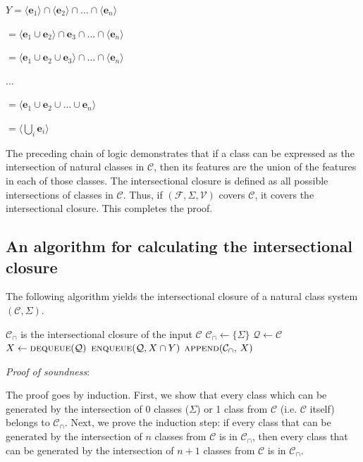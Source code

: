 \documentclass[11pt, oneside]{article}   	%
\begin{document}
$Y = \langle \mathbf{e}_1 \rangle \cap  \langle \mathbf{e}_2 \rangle \cap \ldots \cap  \langle \mathbf{e}_n \rangle$

\quad $ = \langle \mathbf{e}_1 \cup \mathbf{e}_2 \rangle \cap \mathbf{e}_3 \cap \ldots \cap \langle \mathbf{e}_n \rangle$

\quad $ = \langle \mathbf{e}_1 \cup \mathbf{e}_2 \cup \mathbf{e}_3 \rangle \cap \ldots \cap \langle \mathbf{e}_n \rangle$

\quad $\ldots$

\quad $= \langle \mathbf{e}_1 \cup \mathbf{e}_2 \cup \ldots \cup \mathbf{e}_n \rangle$

\quad $= \langle \bigcup_i  \mathbf{e}_i \rangle$

\noindent The preceding chain of logic demonstrates that if a class can be expressed as the intersection of natural classes in $\mathcal C$, then its features are the union of the features in each of those classes. The intersectional closure is defined as all possible intersections of classes in $\mathcal C$. Thus, if $(\mathcal F, \Sigma, \mathcal V)$ covers $\mathcal C$, it covers the intersectional closure. This completes the proof.

\subsection{An algorithm for calculating the intersectional closure}

The following algorithm yields the intersectional closure of a natural class system $(\mathcal C, \Sigma)$.

\noindent \begin{algorithmic}
    \ENSURE $\mathcal C_\cap$ is the intersectional closure of the input $\mathcal C$
    \STATE
    \STATE $\mathcal C_\cap \leftarrow \{ \Sigma \} $
    \STATE $\mathcal Q \leftarrow \mathcal C$
    \STATE
        \STATE $X \leftarrow \textsc{dequeue}(\mathcal Q)$
                \STATE $\textsc{enqueue}(\mathcal Q, X \cap Y)$
            \ENDFOR
            \STATE $\textsc{append}(\mathcal C_\cap, \, X)$
        \ENDIF
    \ENDWHILE
\end{algorithmic}

\vspace{\baselineskip} \noindent \textit{Proof of soundness}:

The proof goes by induction. First, we show that every class which can be generated by the intersection of $0$ classes ($\Sigma$) or 1 class from $\mathcal C$ (i.e. $\mathcal C$ itself) belongs to $\mathcal C_\cap$. Next, we prove the induction step: if every class that can be generated by the intersection of $n$ classes from $\mathcal C$ is in $\mathcal C_\cap$, then every class that can be generated by the intersection of $n+1$ classes from $\mathcal C$ is in $\mathcal C_\cap$.
\end{document}
